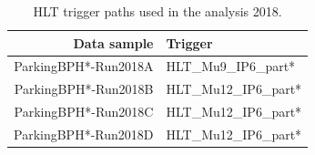 \begin{table}[htb]
\caption{HLT trigger paths used in the analysis 2018.}
\begin{center}
\begin{tabular}{r|l}\hline
\hline
 Data sample & Trigger \\
\hline
 ParkingBPH*-Run2018A & HLT\_Mu9\_IP6\_part* \\
 \hline
 ParkingBPH*-Run2018B & HLT\_Mu12\_IP6\_part* \\
 ParkingBPH*-Run2018C & HLT\_Mu12\_IP6\_part* \\
 ParkingBPH*-Run2018D & HLT\_Mu12\_IP6\_part* \\
 \hline
 \hline
\end{tabular}
\label{tab:triggers18}
\end{center}
\end{table}

